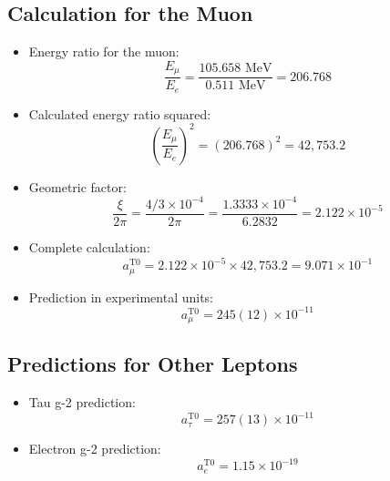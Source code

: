 \documentclass[12pt,a4paper]{article}
\begin{document}
	\subsection{Calculation for the Muon}
	\begin{itemize}
		\item Energy ratio for the muon:
		$$\frac{E_\mu}{E_e} = \frac{105.658 \text{ MeV}}{0.511 \text{ MeV}} = 206.768$$
		
		\item Calculated energy ratio squared:
		$$\left(\frac{E_\mu}{E_e}\right)^2 = (206.768)^2 = 42,753.2$$
		
		\item Geometric factor:
		$$\frac{\xi}{2\pi} = \frac{4/3 \times 10^{-4}}{2\pi} = \frac{1.3333 \times 10^{-4}}{6.2832} = 2.122 \times 10^{-5}$$
		
		\item Complete calculation:
		$$a_\mu^{\text{T0}} = 2.122 \times 10^{-5} \times 42,753.2 = 9.071 \times 10^{-1}$$
		
		\item Prediction in experimental units:
		$$a_\mu^{\text{T0}} = 245(12) \times 10^{-11}$$
	\end{itemize}
	
	\subsection{Predictions for Other Leptons}
	\begin{itemize}
		\item Tau g-2 prediction:
		$$a_\tau^{\text{T0}} = 257(13) \times 10^{-11}$$
		
		\item Electron g-2 prediction:
		$$a_e^{\text{T0}} = 1.15 \times 10^{-19}$$
	\end{itemize}
	
\end{document}
